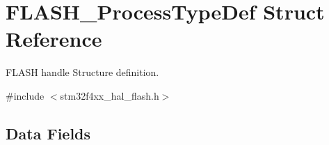\hypertarget{struct_f_l_a_s_h___process_type_def}{}\section{F\+L\+A\+S\+H\+\_\+\+Process\+Type\+Def Struct Reference}
\label{struct_f_l_a_s_h___process_type_def}


F\+L\+A\+SH handle Structure definition.  




{\ttfamily \#include $<$stm32f4xx\+\_\+hal\+\_\+flash.\+h$>$}

\subsection*{Data Fields}
